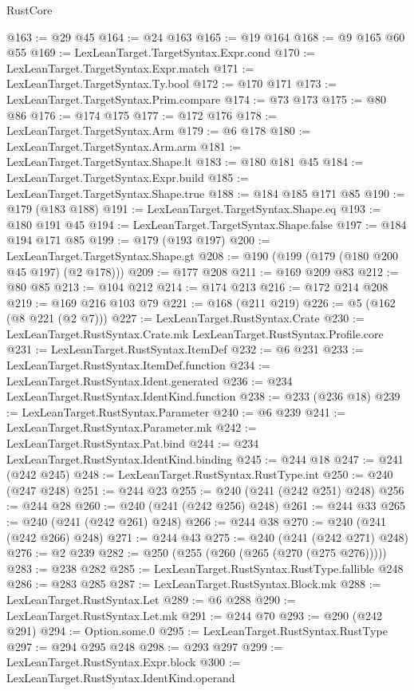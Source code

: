 \begin{lexlean}{RustCore}
\begin{coremodule}
@163 := @29 @45
@164 := @24 @163
@165 := @19 @164
@168 := @9 @165 @60 @55
@169 := LexLeanTarget.TargetSyntax.Expr.cond
@170 := LexLeanTarget.TargetSyntax.Expr.match
@171 := LexLeanTarget.TargetSyntax.Ty.bool
@172 := @170 @171
@173 := LexLeanTarget.TargetSyntax.Prim.compare
@174 := @73 @173
@175 := @80 @86
@176 := @174 @175
@177 := @172 @176
@178 := LexLeanTarget.TargetSyntax.Arm
@179 := @6 @178
@180 := LexLeanTarget.TargetSyntax.Arm.arm
@181 := LexLeanTarget.TargetSyntax.Shape.lt
@183 := @180 @181 @45
@184 := LexLeanTarget.TargetSyntax.Expr.build
@185 := LexLeanTarget.TargetSyntax.Shape.true
@188 := @184 @185 @171 @85
@190 := @179 (@183 @188)
@191 := LexLeanTarget.TargetSyntax.Shape.eq
@193 := @180 @191 @45
@194 := LexLeanTarget.TargetSyntax.Shape.false
@197 := @184 @194 @171 @85
@199 := @179 (@193 @197)
@200 := LexLeanTarget.TargetSyntax.Shape.gt
@208 := @190 (@199 (@179 (@180 @200 @45 @197) (@2 @178)))
@209 := @177 @208
@211 := @169 @209 @83
@212 := @80 @85
@213 := @104 @212
@214 := @174 @213
@216 := @172 @214 @208
@219 := @169 @216 @103 @79
@221 := @168 (@211 @219)
@226 := @5 (@162 (@8 @221 (@2 @7)))
@227 := LexLeanTarget.RustSyntax.Crate
@230 := LexLeanTarget.RustSyntax.Crate.mk LexLeanTarget.RustSyntax.Profile.core
@231 := LexLeanTarget.RustSyntax.ItemDef
@232 := @6 @231
@233 := LexLeanTarget.RustSyntax.ItemDef.function
@234 := LexLeanTarget.RustSyntax.Ident.generated
@236 := @234 LexLeanTarget.RustSyntax.IdentKind.function
@238 := @233 (@236 @18)
@239 := LexLeanTarget.RustSyntax.Parameter
@240 := @6 @239
@241 := LexLeanTarget.RustSyntax.Parameter.mk
@242 := LexLeanTarget.RustSyntax.Pat.bind
@244 := @234 LexLeanTarget.RustSyntax.IdentKind.binding
@245 := @244 @18
@247 := @241 (@242 @245)
@248 := LexLeanTarget.RustSyntax.RustType.int
@250 := @240 (@247 @248)
@251 := @244 @23
@255 := @240 (@241 (@242 @251) @248)
@256 := @244 @28
@260 := @240 (@241 (@242 @256) @248)
@261 := @244 @33
@265 := @240 (@241 (@242 @261) @248)
@266 := @244 @38
@270 := @240 (@241 (@242 @266) @248)
@271 := @244 @43
@275 := @240 (@241 (@242 @271) @248)
@276 := @2 @239
@282 := @250 (@255 (@260 (@265 (@270 (@275 @276)))))
@283 := @238 @282
@285 := LexLeanTarget.RustSyntax.RustType.fallible @248
@286 := @283 @285
@287 := LexLeanTarget.RustSyntax.Block.mk
@288 := LexLeanTarget.RustSyntax.Let
@289 := @6 @288
@290 := LexLeanTarget.RustSyntax.Let.mk
@291 := @244 @70
@293 := @290 (@242 @291)
@294 := Option.some.{0}
@295 := LexLeanTarget.RustSyntax.RustType
@297 := @294 @295 @248
@298 := @293 @297
@299 := LexLeanTarget.RustSyntax.Expr.block
@300 := LexLeanTarget.RustSyntax.IdentKind.operand

\end{coremodule}
\end{lexlean}

